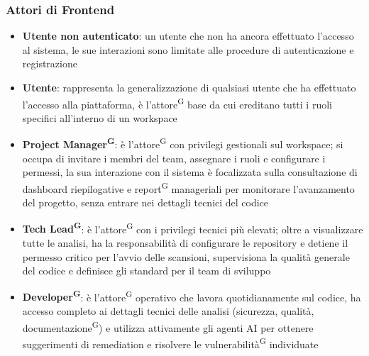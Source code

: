 \documentclass[a4paper, 11pt]{article}
\begin{document}
\subsubsection{Attori di Frontend}
\begin{itemize}
    	\item \textbf{Utente non autenticato}: un utente che non ha ancora effettuato l'accesso al sistema, le sue interazioni sono limitate alle procedure di autenticazione e registrazione

        \item \textbf{Utente}: rappresenta la generalizzazione di qualsiasi utente che ha effettuato l'accesso alla piattaforma, è l'attore\textsuperscript{G} base da cui ereditano tutti i ruoli specifici all'interno di un workspace

        \item \textbf{Project Manager\textsuperscript{G}}: è l'attore\textsuperscript{G} con privilegi gestionali sul workspace; si occupa di invitare i membri del team, assegnare i ruoli e configurare i permessi, la sua interazione con il sistema è focalizzata sulla consultazione di dashboard riepilogative e report\textsuperscript{G} manageriali per monitorare l'avanzamento del progetto, senza entrare nei dettagli tecnici del codice

        \item \textbf{Tech Lead\textsuperscript{G}}: è l'attore\textsuperscript{G} con i privilegi tecnici più elevati; oltre a visualizzare tutte le analisi, ha la responsabilità di configurare le repository e detiene il permesso critico per l'avvio delle scansioni, supervisiona la qualità generale del codice e definisce gli standard per il team di sviluppo

        \item \textbf{Developer\textsuperscript{G}}: è l'attore\textsuperscript{G} operativo che lavora quotidianamente sul codice, ha accesso completo ai dettagli tecnici delle analisi (sicurezza, qualità, documentazione\textsuperscript{G}) e utilizza attivamente gli agenti AI per ottenere suggerimenti di remediation e risolvere le vulnerabilità\textsuperscript{G} individuate
\end{itemize}
\end{document}
